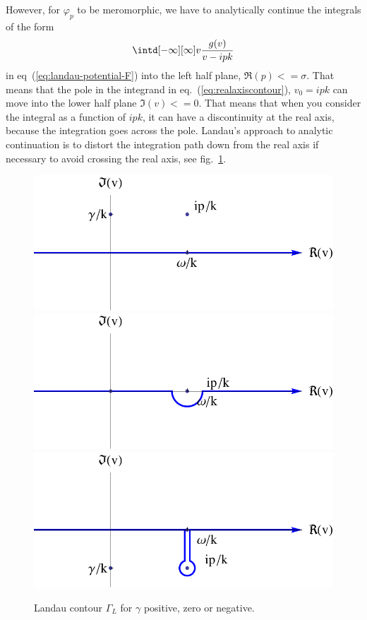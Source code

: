 \documentclass[physics,phd,nolot,nolof]{uccthesis}%
\begin{document}
However, for $\varphi_p$ to be meromorphic, we have to analytically continue the integrals  of the form
\begin{equation}
	\intd[-\infty][\infty]v \frac{g(v)}{v-ipk}
	\label{eq:realaxiscontour}
\end{equation}
in eq~(\ref{eq:landau-potential-F}) into the left half plane, $\mathfrak{R}(p)<=\sigma$.
That means that the pole in the integrand in eq.~(\ref{eq:realaxiscontour}), $v_0=ipk$ can move into the lower half plane $\mathfrak{I}(v)<=0$.
That means that when you consider the integral as a function of $ipk$, it can have a discontinuity at the real axis, because the integration goes across the pole. 
Landau's approach to analytic continuation is to distort the integration path down from the real axis if necessary to avoid crossing the real axis, see fig.~\ref{fig:landaucontour}.
\begin{figure}[h]
	\begin{center}
\includegraphics[width=.75\textwidth]{plus.pdf}\\
\includegraphics[width=.75\textwidth]{null.pdf}\\
\includegraphics[width=.75\textwidth]{minus.pdf}
	\end{center}
	\caption{Landau contour $\Gamma_L$ for $\gamma$ positive, zero or negative.}
	\label{fig:landaucontour}
\end{figure}
\end{document}
